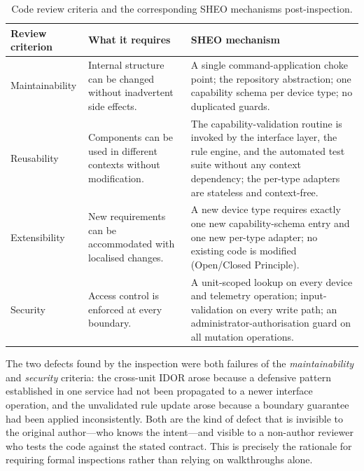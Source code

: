 \begin{table}[htbp]
\centering
\caption{Code review criteria and the corresponding SHEO mechanisms
post-inspection.}
\label{tab:review-criteria}
\begin{tabularx}{\textwidth}{L{0.22\textwidth} Y Y}
\toprule
\textbf{Review criterion} & \textbf{What it requires} & \textbf{SHEO mechanism} \\
\midrule
Maintainability &
  Internal structure can be changed without inadvertent side effects. &
  A single command-application choke point; the repository abstraction; one
  capability schema per device type; no duplicated guards. \\
Reusability &
  Components can be used in different contexts without modification. &
  The capability-validation routine is invoked by the interface layer, the rule
  engine, and the automated test suite without any context dependency; the per-type
  adapters are stateless and context-free. \\
Extensibility &
  New requirements can be accommodated with localised changes. &
  A new device type requires exactly one new capability-schema entry and one new
  per-type adapter; no existing code is modified (Open/Closed Principle). \\
Security &
  Access control is enforced at every boundary. &
  A unit-scoped lookup on every device and telemetry operation; input-validation
  on every write path; an administrator-authorisation guard on all mutation
  operations. \\
\bottomrule
\end{tabularx}
\end{table}

The two defects found by the inspection were both failures of the
\emph{maintainability} and \emph{security} criteria: the cross-unit IDOR arose
because a defensive pattern established in one service had not been propagated to a
newer interface operation, and the unvalidated rule update arose because a boundary
guarantee had been applied inconsistently. Both are the kind of defect that is invisible to the
original author---who knows the intent---and visible to a non-author reviewer who
tests the code against the stated contract. This is precisely the rationale for
requiring formal inspections rather than relying on walkthroughs alone.
